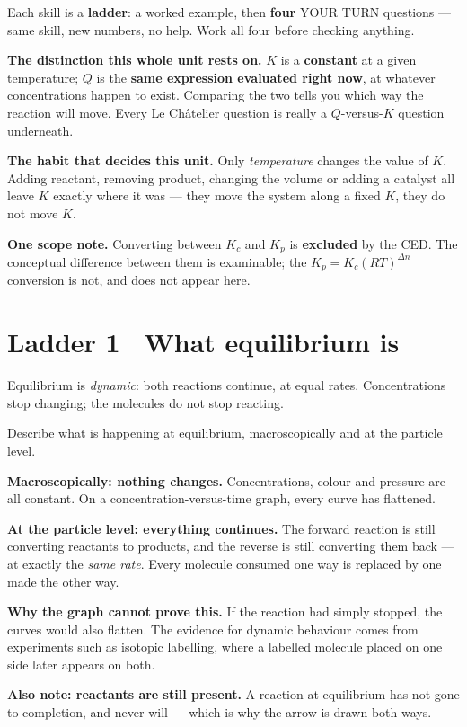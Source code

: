 \documentclass{apchem-worksheet}
\begin{document}
\apctitleblock

\begin{apcnote}
Each skill is a \textbf{ladder}: a worked example, then \textbf{four}
YOUR TURN questions --- same skill, new numbers, no help. Work all four
before checking anything.

\textbf{The distinction this whole unit rests on.} $K$ is a
\textbf{constant} at a given temperature; $Q$ is the \textbf{same
expression evaluated right now}, at whatever concentrations happen to
exist. Comparing the two tells you which way the reaction will move. Every
Le Ch\^{a}telier question is really a $Q$-versus-$K$ question underneath.

\textbf{The habit that decides this unit.} Only \emph{temperature} changes
the value of $K$. Adding reactant, removing product, changing the volume
or adding a catalyst all leave $K$ exactly where it was --- they move the
system along a fixed $K$, they do not move $K$.

\textbf{One scope note.} Converting between $K_c$ and $K_p$ is
\textbf{excluded} by the CED. The conceptual difference between them is
examinable; the $K_p = K_c(RT)^{\Delta n}$ conversion is not, and does not
appear here.
\end{apcnote}

\section*{\sffamily Ladder 1 \textbullet\ What equilibrium is}
 

Equilibrium is \emph{dynamic}: both reactions continue, at equal rates.
Concentrations stop changing; the molecules do not stop reacting.

\begin{workedexample}
Describe what is happening at equilibrium, macroscopically and at the
particle level.

\textbf{Macroscopically: nothing changes.} Concentrations, colour and
pressure are all constant. On a concentration-versus-time graph, every
curve has flattened.

\textbf{At the particle level: everything continues.} The forward reaction
is still converting reactants to products, and the reverse is still
converting them back --- at exactly the \emph{same rate}. Every molecule
consumed one way is replaced by one made the other way.

\textbf{Why the graph cannot prove this.} If the reaction had simply
stopped, the curves would also flatten. The evidence for dynamic behaviour
comes from experiments such as isotopic labelling, where a labelled
molecule placed on one side later appears on both.

\textbf{Also note: reactants are still present.} A reaction at equilibrium
has not gone to completion, and never will --- which is why the arrow is
drawn both ways.
\end{workedexample}
\end{document}
